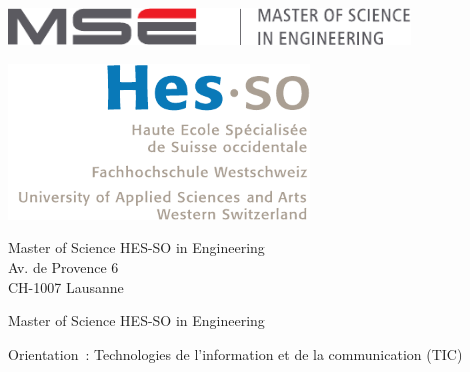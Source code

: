\begin{titlepage}
	
	\vspace{-1cm}
	\begin{minipage}{0.49\textwidth}
		\begin{flushleft} \large
			\includegraphics[width=0.8\textwidth]{figures/titlepage_fig/mse.pdf}
		\end{flushleft}
	\end{minipage}
	\begin{minipage}{0.5\textwidth}
		\begin{flushright} \large
			\includegraphics[width=0.6\textwidth]{figures/titlepage_fig/hesso2.pdf}
		\end{flushright}
	\end{minipage}
	
	\begin{flushleft}
		\footnotesize 		
		Master of Science HES-SO in Engineering\\
		Av. de Provence 6\\CH-1007 Lausanne
	\end{flushleft}
	
	\vspace{1.7cm}
	
	\begin{flushright}
		{\huge Master of Science HES-SO in Engineering}
		
		\vspace{0.5cm}
		{\Large Orientation : Technologies de l’information et de la communication (TIC)}
		
		\vspace{1.7cm}

		\begin{spacing}{2.0}
			{\Huge \mysubject}
		\end{spacing}


\end{flushright}
\end{titlepage}
